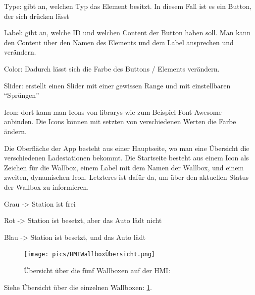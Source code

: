 \begin{compactitem}
  \item Type: gibt an, welchen Typ das Element besitzt. In diesem Fall ist es ein Button, der sich drücken lässt 
  \item Label: gibt an, welche ID und welchen Content der Button haben soll. Man kann den Content über den Namen des Elements und dem Label ansprechen und verändern.
  \item Color: Dadurch lässt sich die Farbe des Buttons / Elements verändern. 
  \item Slider: erstellt einen Slider mit einer gewissen Range und mit einstellbaren “Sprüngen” 
  \item Icon: dort kann man Icons von librarys wie zum Beispiel Font-Awesome anbinden. Die Icons können mit setzten von verschiedenen Werten die Farbe ändern. 
\end{compactitem}
Die Oberfläche der App besteht aus einer Hauptseite, wo man eine Übersicht die verschiedenen Ladestationen bekommt. Die Startseite besteht aus einem Icon als Zeichen für die Wallbox, einem Label mit dem Namen der Wallbox, und einem zweiten, dynamischen Icon. Letzteres ist dafür da, um über den aktuellen Status der Wallbox zu informieren.  

\begin{compactitem}
  \item Grau -> Station ist frei 
  \item Rot -> Station ist besetzt, aber das Auto lädt nicht 
  \item Blau -> Station ist besetzt, und das Auto lädt 
\end{compactitem}


\begin{figure}
  \centering
  \texttt{[image: pics/HMIWallboxÜbersicht.png]}
  \caption{Übersicht über die fünf Wallboxen auf der HMI: }
  \label{fig:impl:HMIWallboxÜbersicht}
\end{figure}

Siehe Übersicht über die einzelnen Wallboxen: \ref{fig:impl:HMIWallboxÜbersicht}.



